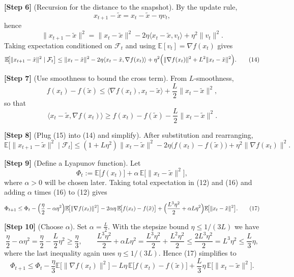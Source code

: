 \documentclass{article}
\newcommand{\EE}{\mathbb{E}}
\newcommand{\grad}{\nabla}
\begin{document}
\noindent\textbf{[Step 6]} (Recursion for the distance to the snapshot). By the update rule,
\[
x_{t+1}-\tilde{x}=x_t-\tilde{x}-\eta v_t,
\]
hence
\[
\|x_{t+1}-\tilde{x}\|^{2}
= \|x_t-\tilde{x}\|^{2}-2\eta\langle x_t-\tilde{x},v_t\rangle+\eta^{2}\|v_t\|^{2}.
\tag{13}
\]
Taking expectation conditioned on $\mathcal{F}_t$ and using $\EE[v_t]=\grad f(x_t)$ gives
\[
\EE\!\bigl[\|x_{t+1}-\tilde{x}\|^{2}\mid\mathcal{F}_t\bigr]
\le \|x_t-\tilde{x}\|^{2}
     -2\eta\langle x_t-\tilde{x},\grad f(x_t)\rangle
     +\eta^{2}\Bigl(\|\grad f(x_t)\|^{2}+L^{2}\|x_t-\tilde{x}\|^{2}\Bigr).
\tag{14}
\]

\noindent\textbf{[Step 7]} (Use smoothness to bound the cross term). From $L$‑smoothness,
\[
f(x_t)-f(\tilde{x})\le\langle\grad f(x_t),x_t-\tilde{x}\rangle
                     +\frac{L}{2}\|x_t-\tilde{x}\|^{2},
\]
so that
\[
\langle x_t-\tilde{x},\grad f(x_t)\rangle\ge f(x_t)-f(\tilde{x})-\frac{L}{2}\|x_t-\tilde{x}\|^{2}.
\tag{15}
\]

\noindent\textbf{[Step 8]} (Plug (15) into (14) and simplify). After substitution and rearranging,
\[
\EE\!\bigl[\|x_{t+1}-\tilde{x}\|^{2}\mid\mathcal{F}_t\bigr]
\le (1+L\eta^{2})\|x_t-\tilde{x}\|^{2}
    -2\eta\bigl(f(x_t)-f(\tilde{x})\bigr)
    +\eta^{2}\|\grad f(x_t)\|^{2}.
\tag{16}
\]

\noindent\textbf{[Step 9]} (Define a Lyapunov function). Let
\[
\Phi_t:=\EE\!\bigl[f(x_t)\bigr]
       +\alpha\,\EE\!\bigl[\|x_t-\tilde{x}\|^{2}\bigr],
\]
where $\alpha>0$ will be chosen later. Taking total expectation in (12) and (16) and adding $\alpha$ times (16) to (12) gives
\[
\Phi_{t+1}
\le \Phi_t
   -\Bigl(\frac{\eta}{2}-\alpha\eta^{2}\Bigr)\EE\!\bigl[\|\grad f(x_t)\|^{2}\bigr]
   -2\alpha\eta\,\EE\!\bigl[f(x_t)-f(\tilde{x})\bigr]
   +\Bigl(\frac{L^{3}\eta^{2}}{2}+\alpha L\eta^{2}\Bigr)\EE\!\bigl[\|x_t-\tilde{x}\|^{2}\bigr].
\tag{17}
\]

\noindent\textbf{[Step 10]} (Choose $\alpha$). Set $\alpha=\frac{L}{2}$. With the stepsize bound $\eta\le 1/(3L)$ we have
\[
\frac{\eta}{2}-\alpha\eta^{2}
= \frac{\eta}{2}-\frac{L}{2}\eta^{2}
\ge \frac{\eta}{3},
\qquad
\frac{L^{3}\eta^{2}}{2}+\alpha L\eta^{2}
= \frac{L^{3}\eta^{2}}{2}+\frac{L^{2}\eta^{2}}{2}
\le \frac{2L^{3}\eta^{2}}{2}=L^{3}\eta^{2}\le \frac{L}{3}\eta,
\]
where the last inequality again uses $\eta\le 1/(3L)$. Hence (17) simplifies to
\[
\Phi_{t+1}
\le \Phi_t
   -\frac{\eta}{3}\EE\!\bigl[\|\grad f(x_t)\|^{2}\bigr]
   -L\eta\,\EE\!\bigl[f(x_t)-f(\tilde{x})\bigr]
   +\frac{L}{3}\eta\,\EE\!\bigl[\|x_t-\tilde{x}\|^{2}\bigr].
\tag{18}
\]
\end{document}
